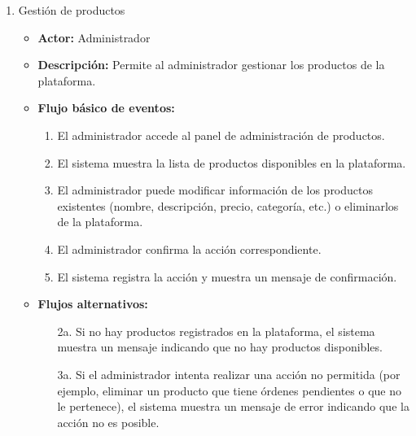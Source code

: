\begin{enumerate}[CU-1:]
\item{Gestión de productos}
\begin{itemize}
	\item \textbf{Actor:} Administrador
	\item \textbf{Descripción:} Permite al administrador gestionar los productos de la plataforma.
	\item \textbf{Flujo básico de eventos:}
	\begin{enumerate}[1:]
		\item El administrador accede al panel de administración de productos.
		\item El sistema muestra la lista de productos disponibles en la plataforma.
		\item El administrador puede modificar información de los productos existentes (nombre, descripción, precio, categoría, etc.) o eliminarlos de la plataforma.
		\item El administrador confirma la acción correspondiente.
		\item El sistema registra la acción y muestra un mensaje de confirmación.
		\end{enumerate}
	\item \textbf{Flujos alternativos:}
		\begin{itemize}
		\item [2a.] Si no hay productos registrados en la plataforma, el sistema muestra un mensaje indicando que no hay productos disponibles.
		\item [3a.] Si el administrador intenta realizar una acción no permitida (por ejemplo, eliminar un producto que tiene órdenes pendientes o que no le pertenece), el sistema muestra un mensaje de error indicando que la acción no es posible.
		\end{itemize}
\end{itemize}


\end{enumerate}
